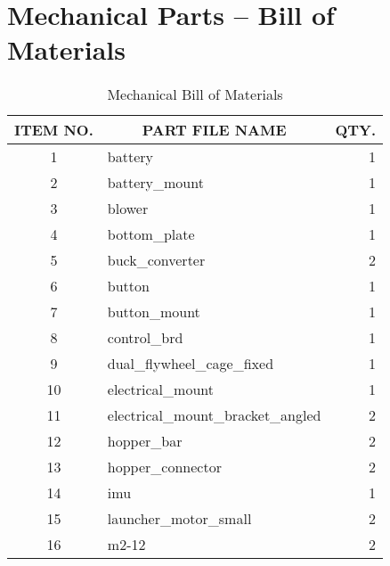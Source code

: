 \chapter{Mechanical Parts -- Bill of Materials}
\label{appendix:mech_bom}

\begin{longtable}{clr}
	\caption{Mechanical Bill of Materials}
	\label{tab:mech_bom}
	\endfirsthead
	\endhead
	\hline
			ITEM NO. & \multicolumn{1}{c}{PART FILE NAME}      & \multicolumn{1}{c}{QTY.} \\ \hline
	1        & battery                                 & 1                        \\ \hline
	2        & battery\_mount                          & 1                        \\ \hline
	3        & blower                                  & 1                        \\ \hline
	4        & bottom\_plate                           & 1                        \\ \hline
	5        & buck\_converter                         & 2                        \\ \hline
	6        & button                                  & 1                        \\ \hline
	7        & button\_mount                           & 1                        \\ \hline
	8        & control\_brd                            & 1                        \\ \hline
	9        & dual\_flywheel\_cage\_fixed             & 1                        \\ \hline
	10       & electrical\_mount                       & 1                        \\ \hline
	11       & electrical\_mount\_bracket\_angled      & 2                        \\ \hline
	12       & hopper\_bar                             & 2                        \\ \hline
	13       & hopper\_connector                       & 2                        \\ \hline
	14       & imu                                     & 1                        \\ \hline
	15       & launcher\_motor\_small                  & 2                        \\ \hline
	16       & m2-12                                   & 2                        \\ \hline

\end{longtable}
